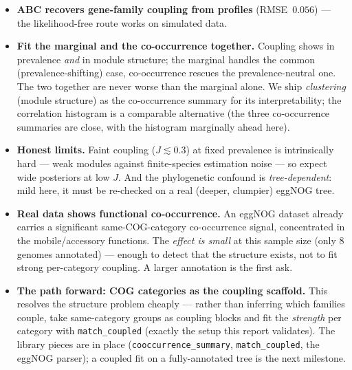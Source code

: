 \documentclass[11pt]{article}
\begin{document}
\begin{itemize}\setlength\itemsep{0.15em}
\item \textbf{ABC recovers gene-family coupling from profiles} (RMSE~$0.056$) --- the
likelihood-free route works on simulated data.
\item \textbf{Fit the marginal and the co-occurrence together.} Coupling shows in prevalence
\emph{and} in module structure; the marginal handles the common (prevalence-shifting) case,
co-occurrence rescues the prevalence-neutral one. The two together are never worse than the
marginal alone. We ship \emph{clustering} (module structure) as the co-occurrence summary for its
interpretability; the correlation histogram is a comparable alternative (the three co-occurrence
summaries are close, with the histogram marginally ahead here).
\item \textbf{Honest limits.} Faint coupling ($J\!\lesssim\!0.3$) at fixed prevalence is
intrinsically hard --- weak modules against finite-species estimation noise --- so expect wide
posteriors at low $J$. And the phylogenetic confound is \emph{tree-dependent}: mild here, it must
be re-checked on a real (deeper, clumpier) eggNOG tree.
\item \textbf{Real data shows functional co-occurrence.} An eggNOG dataset already carries a
significant same-COG-category co-occurrence signal, concentrated in the mobile/accessory functions.
The \emph{effect is small} at this sample size (only $8$ genomes annotated) --- enough to detect
that the structure exists, not to fit strong per-category coupling. A larger annotation is the
first ask.
\item \textbf{The path forward: COG categories as the coupling scaffold.} This resolves the
structure problem cheaply --- rather than inferring which families couple, take same-category
groups as coupling blocks and fit the \emph{strength} per category with \texttt{match\_coupled}
(exactly the setup this report validates). The library pieces are in place
(\texttt{cooccurrence\_summary}, \texttt{match\_coupled}, the eggNOG parser); a coupled fit on a
fully-annotated tree is the next milestone.
\end{itemize}
\end{document}
